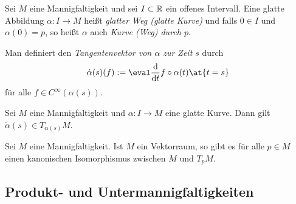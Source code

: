 \begin{definition}
  Sei $M$ eine Mannigfaltigkeit und sei $I\subset \mathbb{R}$ ein offenes Intervall. Eine glatte
  Abbildung $\alpha \colon I \to M$ heißt \emph{glatter Weg (glatte
    Kurve)} und falls $0\in I$ und $\alpha(0) = p$, so heißt $\alpha$
  auch \emph{Kurve (Weg) durch $p$}.

  Man definiert den \emph{Tangentenvektor von $\alpha$ zur Zeit $s$} durch
  \begin{equation*}
    \dot\alpha(s)(f) := \eval\ddt f\circ\alpha(t)\at{t=s} 
  \end{equation*}
  für alle $f\in C^\infty(\alpha(s))$.
\end{definition}

\begin{proposition}
  Sei $M$ eine Mannigfaltigkeit und $\alpha \colon I \to M$ eine
  glatte Kurve. Dann gilt $\dot\alpha(s) \in T_{\alpha(s)}M$.
\end{proposition}

\begin{proposition}
  Sei $M$ eine Mannigfaltigkeit. Ist $M$ ein Vektorraum, so gibt es
  für alle $p\in M$
  einen kanonischen Isomorphismus zwischen $M$ und $T_pM$.
\end{proposition}

\subsection{Produkt- und Untermannigfaltigkeiten}
\label{sec:prumfk}



